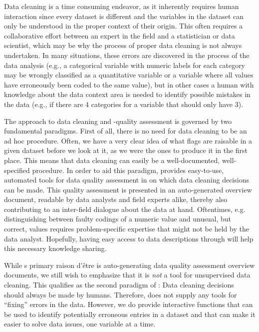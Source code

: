 \documentclass[article,shortnames]{jss}
\begin{document}
Data cleaning is a time consuming endeavor, as it inherently requires
human interaction since every dataset is different and the variables
in the dataset can only be understood in the proper context of their
origin. This often requires a collaborative effort between an expert
in the field and a statistician or data scientist, which may be why
the process of proper data cleaning is not always undertaken. In many
situations, these errors are discovered in the process of the data
analysis (e.g., a categorical variable with numeric labels for each
category may be wrongly classified as a quantitative variable or a
variable where all values have erroneously been coded to the same
value), but in other cases a human with knowledge about the data
context area is needed to identify possible mistakes in the data
(e.g., if there are 4 categories for a variable that should only have
3).

The  approach to data cleaning and -quality assessment is
governed by two fundamental paradigms. First of all, there is no need
for data cleaning to be an ad hoc procedure. Often, we have a very
clear idea of what flags are raisable in a given dataset before we
look at it, as we were the ones to produce it in the first place. This
means that data cleaning can easily be a well-documented,
well-specified procedure. In order to aid this paradigm, 
provides easy-to-use, automated tools for data quality assessment in
 on which data cleaning decisions can be made. This quality
assessment is presented in an auto-generated overview document,
readable by data analysts and field experts alike, thereby also
contributing to an inter-field dialogue about the data at
hand. Oftentimes, e.g. distinguishing between faulty codings of a
numeric value and unusual, but correct, values requires
problem-specific expertise that might not be held by the data
analyst. Hopefully, having easy access to data descriptions through
 will help this necessary knowledge sharing.

While s primary raison d'être is auto-generating data
quality assessment overview documents, we still wish to emphasize that
it is \emph{not} a tool for unsupervised data cleaning. This qualifies
as the second paradigm of : Data cleaning decisions
should always be made by humans. Therefore,  does not
supply any tools for ``fixing'' errors in the data. However, we do
provide interactive functions that can be used to identify potentially
erroneous entries in a dataset and that can make it easier to solve
data issues, one variable at a time.
\end{document}

